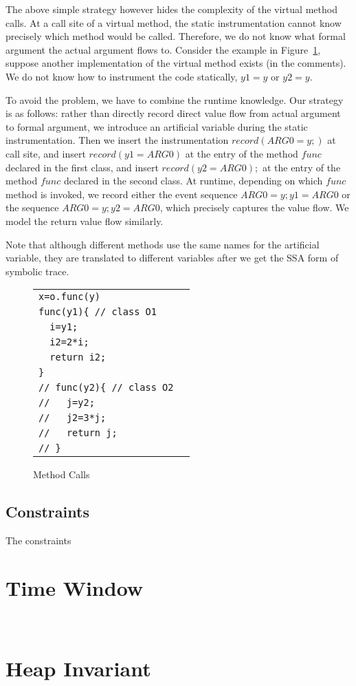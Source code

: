 The above simple strategy however hides the complexity of the virtual method calls. At a call site of a virtual method, the static instrumentation cannot know precisely which method would be called. Therefore, we do not know what formal argument the actual argument flows to. Consider the example in Figure~\ref{fig:methcall}, suppose another implementation of the virtual method exists (in the comments).  We do not know how to instrument the code statically, $y1=y$ or $y2=y$. 


To avoid the problem, we have to combine the runtime knowledge. 
Our strategy is as follows: rather than directly record direct value flow from actual argument to formal argument, we introduce an artificial variable during the static instrumentation. Then we  insert the instrumentation $record(ARG0=y;)$ at call site, and insert  $record(y1=ARG0)$ at the entry of the method $func$ declared in the first class, and insert $record(y2=ARG0);$ at the entry of the method $func$ declared in the second class. At runtime, depending on which $func$ method is invoked, we record either the event sequence $ARG0=y; y1=ARG0$ or the sequence $ARG0=y; y2=ARG0$, which precisely captures the value flow. We model the return value flow similarly. 

Note that although different methods use the same names for the artificial variable,  they are translated to different variables after we get the SSA form of symbolic trace. 

 

\begin{figure}
\centering
\begin{tabular}{ll}
{\tt  x=o.func(y) } &  \\ 
 {\tt  func(y1)\{ // class O1} &  \\
 {\tt  \ \      i=y1; } & \\
 {\tt  \ \      i2=2*i; } &  \\
 {\tt  \  \      return i2;} & \\ 
 {\tt           \}} & \\ 
 
  {\tt //  func(y2)\{ // class O2} &  \\
 {\tt  // \ \      j=y2; } & \\
 {\tt  // \ \      j2=3*j; } &  \\
 {\tt  // \  \      return j;} & \\ 
 {\tt  //         \}} & \\ 
\end{tabular}
\caption{Method Calls}
\label{fig:methcall}
\end{figure}





\subsection{Constraints}
The constraints 












\section{Time Window}~\label{sec:basic}

\section{Heap Invariant}~\label{sec:basic}
